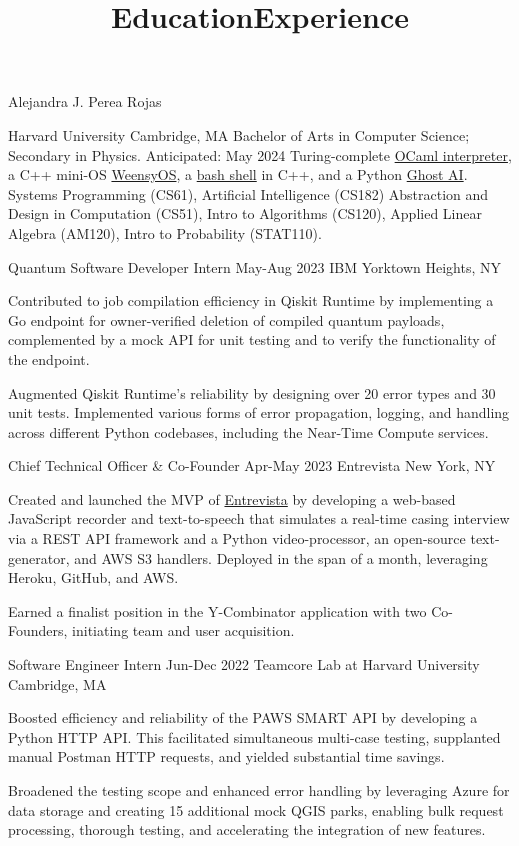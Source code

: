 \documentclass[11pt]{article}
\begin{document}
  \centerline{\Large{Alejandra J. Perea Rojas}}\vspace{1mm}

  \links

  \title{Education}
    \edu
    {Harvard University}
    {Cambridge, MA}
    {Bachelor of Arts in Computer Science; Secondary in Physics.}
    {Anticipated: May 2024}
    { 
      Turing-complete \href{https://book.cs51.io/pdfs/abstraction-21-project.pdf}{OCaml interpreter},
      a C++ mini-OS \href{https://cs61.seas.harvard.edu/site/2021/WeensyOS/}{WeensyOS},
      a \href{https://cs61.seas.harvard.edu/site/2021/Shell/}{bash shell} in C++, 
      and a Python \href{http://procaccia.info/courses/CS182-F22/pset3.pdf}{Ghost AI}.
    }
    { 
      Systems Programming (CS61), Artificial Intelligence (CS182)
      Abstraction and Design in Computation (CS51), \newline
      Intro to Algorithms (CS120), Applied Linear Algebra (AM120), 
      Intro to Probability (STAT110).
    }

  \title{Experience}
    \job
    {Quantum Software Developer Intern}
    {May-Aug 2023}
    {IBM}
    {Yorktown Heights, NY}
    {
      \item Contributed to job compilation efficiency in Qiskit Runtime by implementing a Go endpoint for owner-verified deletion of compiled quantum payloads, complemented by a mock API for unit testing and to verify the functionality of the endpoint.
      \item Augmented Qiskit Runtime's reliability by designing over 20 error types and 30 unit tests. Implemented various forms of error propagation, logging, and handling across different Python codebases, including the Near-Time Compute services.
    }

    \job
    {Chief Technical Officer \& Co-Founder}
    {Apr-May 2023}
    {Entrevista}
    {New York, NY}
    {
      \item Created and launched the MVP of \href{https://www.entrevista.ai}{Entrevista} by developing a web-based JavaScript recorder and text-to-speech that simulates a real-time casing interview via a REST API framework and a Python video-processor, an open-source text-generator, and AWS S3 handlers. Deployed in the span of a month, leveraging Heroku, GitHub, and AWS.
      \item Earned a finalist position in the Y-Combinator application with two Co-Founders, initiating team and user acquisition.
    }

    \job
    {Software Engineer Intern}
    {Jun-Dec 2022}
    {Teamcore Lab at Harvard University}
    {Cambridge, MA}
    {
      \item Boosted efficiency and reliability of the PAWS SMART API by developing a Python HTTP API. This facilitated simultaneous multi-case testing, supplanted manual Postman HTTP requests, and yielded substantial time savings.
      \item Broadened the testing scope and enhanced error handling by leveraging Azure for data storage and creating 15 additional mock QGIS parks, enabling bulk request processing, thorough testing, and accelerating the integration of new features.
    }
\end{document}
